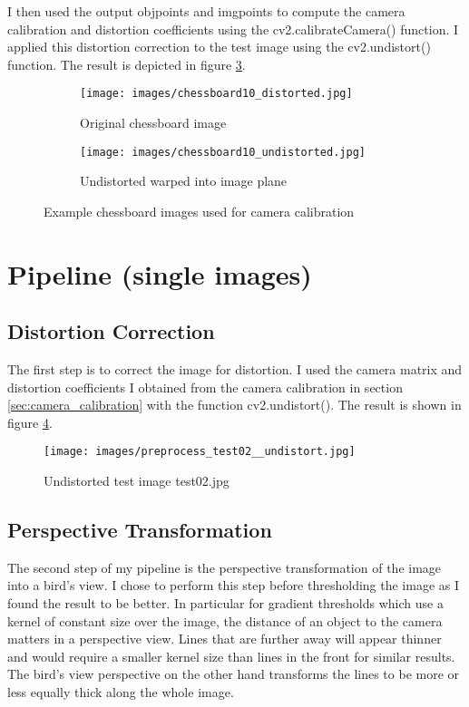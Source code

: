 \documentclass[a4paper, 11pt, DIV=14]{scrartcl}
\begin{document}
I then used the output objpoints and imgpoints to compute the camera calibration and distortion coefficients using the cv2.calibrateCamera() function. I applied this distortion correction to the test image using the cv2.undistort() function. The result is depicted in figure \ref{fig:camera_calibration}.

\begin{figure}[h]
    \centering
    \begin{subfigure}{0.45\textwidth}
        \texttt{[image: images/chessboard10\_distorted.jpg]}
        \caption{Original chessboard image}
        \label{fig:chessboard_original}
    \end{subfigure}\quad
    \begin{subfigure}{0.45\textwidth}
        \texttt{[image: images/chessboard10\_undistorted.jpg]}
        \caption{Undistorted warped into image plane}
        \label{fig:chessboard_undistorted}
    \end{subfigure} 
    \caption{Example chessboard images used for camera calibration}
    \label{fig:camera_calibration}
\end{figure}

\section{Pipeline (single images)}

\subsection{Distortion Correction}
The first step is to correct the image for distortion. I used the camera matrix and distortion coefficients I obtained from the camera calibration in section \ref{sec:camera_calibration} with the function cv2.undistort(). The result is shown in figure \ref{fig:test02_undistort}.

\begin{figure}
\texttt{[image: images/preprocess\_test02\_\_undistort.jpg]}
\caption{Undistorted test image test02.jpg}
\label{fig:test02_undistort}
\end{figure}

\subsection{Perspective Transformation}
The second step of my pipeline is the perspective transformation of the image into a bird's view. I chose to perform this step before thresholding the image as I found the result to be better. In particular for gradient thresholds which use a kernel of constant size over the image, the distance of an object to the camera matters in a perspective view. Lines that are further away will appear thinner and would require a smaller kernel size than lines in the front for similar results. The bird's view perspective on the other hand transforms the lines to be more or less equally thick along the whole image.
\end{document}
